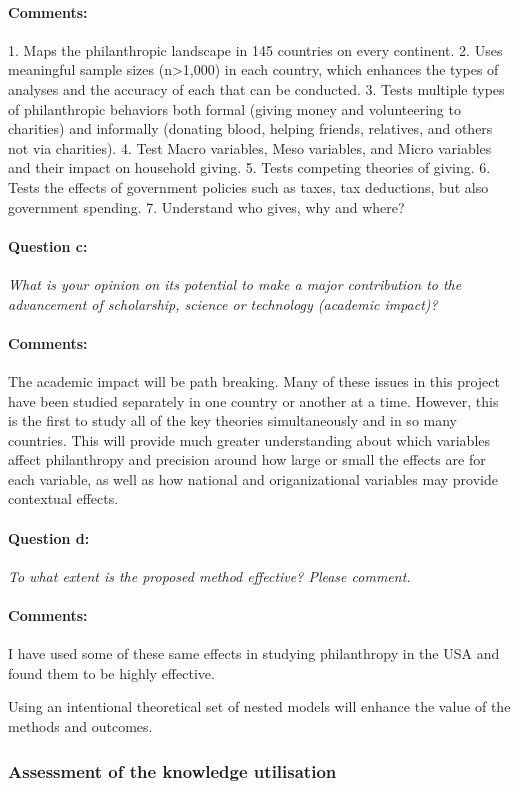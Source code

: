 \documentclass[twocolumn, serif, rga, numeric]{jote-article}
\begin{document}
\paragraph{Comments:}
1. Maps the philanthropic landscape in 145 countries on every continent.
2. Uses meaningful sample sizes (n>1,000) in each country, which enhances the types of analyses and the accuracy of each that can be conducted.
3. Tests multiple types of philanthropic behaviors both formal (giving money and volunteering to charities) and informally (donating blood, helping friends, relatives, and others not via charities).
4. Test Macro variables, Meso variables, and Micro variables and their impact on household giving.
5. Tests competing theories of giving.
6. Tests the effects of government policies such as taxes, tax deductions, but also government spending.
7. Understand who gives, why and where?
\paragraph{Question c:}
\textit{What is your opinion on its potential to make a major contribution to the advancement of scholarship, science or technology (academic impact)?}
\paragraph{Comments:}
The academic impact will be path breaking. Many of these issues in this project have been studied separately in one country or another at a time. However, this is the first to study all of the key theories simultaneously and in so many countries. This will provide much greater understanding about which variables affect philanthropy and precision around how large or small the effects are for each variable, as well as how national and origanizational variables may provide contextual effects.
\paragraph{Question d:}
\textit{To what extent is the proposed method effective? Please comment.}
\paragraph{Comments:}
I have used some of these same effects in studying philanthropy in the USA and found them to be highly effective.

Using an intentional theoretical set of nested models will enhance the value of the methods and outcomes.
 {}\subsubsection*{Assessment of the knowledge utilisation} 
\end{document}
